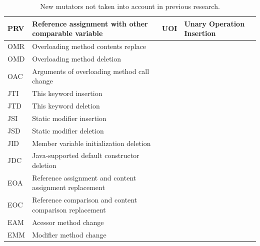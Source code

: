\documentclass[conference,draftclsnofoot,onecolumn]{IEEEtran}
\begin{document}
\begin{table}[ht]
\begin{tabular}{|l|l|l|l|}
PRV & Reference assignment   with other comparable variable     & UOI                   & Unary Operation Insertion       \\ \hline
OMR & Overloading method   contents replace                     & \multicolumn{1}{l|}{} &                                 \\ \hline
OMD & Overloading method   deletion                             & \multicolumn{1}{l|}{} &                                 \\ \hline
OAC & Arguments of   overloading method call change             & \multicolumn{1}{l|}{} &                                 \\ \hline
JTI & This keyword insertion                                    & \multicolumn{1}{l|}{} &                                 \\ \hline
JTD & This keyword deletion                                     & \multicolumn{1}{l|}{} &                                 \\ \hline
JSI & Static modifier   insertion                               & \multicolumn{1}{l|}{} &                                 \\ \hline
JSD & Static modifier   deletion                                & \multicolumn{1}{l|}{} &                                 \\ \hline
JID & Member variable   initialization deletion                 & \multicolumn{1}{l|}{} &                                 \\ \hline
JDC & Java-supported default   constructor deletion             & \multicolumn{1}{l|}{} &                                 \\ \hline
EOA & Reference assignment   and content assignment replacement & \multicolumn{1}{l|}{} &                                 \\ \hline
EOC & Reference comparison   and content comparison replacement & \multicolumn{1}{l|}{} &                                 \\ \hline
EAM & Acessor method change                                     & \multicolumn{1}{l|}{} &                                 \\ \hline
EMM & Modifier method change                                    & \multicolumn{1}{l|}{} &                                 \\ \hline
\end{tabular}
\caption{\label{tab:mutators-current}New mutators not taken into account in previous research.}
\end{table}
\end{document}
